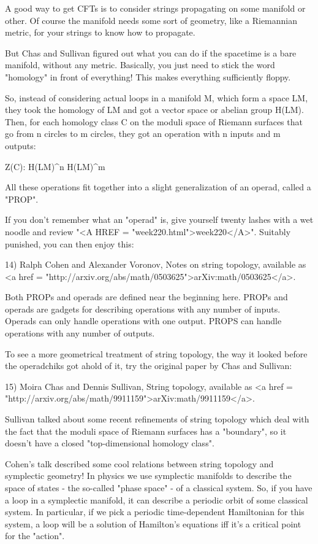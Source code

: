 A good way to get CFTs is to consider strings propagating on some
manifold or other.  Of course the manifold needs some sort of 
geometry, like a Riemannian metric, for your strings to know how 
to propagate.

But Chas and Sullivan figured out what you can do if the spacetime 
is a bare manifold, without any metric.  Basically, you just 
need to stick the word "homology" in front of everything!  This
makes everything sufficiently floppy.

So, instead of considering actual loops in a manifold M, 
which form a space LM, they took the homology of LM and got
a vector space or abelian group H(LM).  Then, for each homology 
class C on the moduli space of Riemann surfaces that go from n 
circles to m circles, they got an operation with n inputs and m
outputs:

Z(C): H(LM)^{\otimes n} \to  H(LM)^{\otimes m}

All these operations fit together into a slight generalization of 
an operad, called a "PROP".

If you don't remember what an "operad" is, give yourself
twenty lashes with a wet noodle and review "<A HREF =
"week220.html">week220</A>".  Suitably punished, you can then
enjoy this:

14) Ralph Cohen and Alexander Voronov, Notes on string topology,
available as <a href =
"http://arxiv.org/abs/math/0503625">arXiv:math/0503625</a>.

Both PROPs and operads are defined near the beginning here.
PROPs and operads are gadgets for describing operations with 
any number of inputs.  Operads can only handle operations with 
one output.  PROPS can handle operations with any number of outputs.

To see a more geometrical treatment of string topology, the way
it looked before the operadchiks got ahold of it, try the original 
paper by Chas and Sullivan:

15) Moira Chas and Dennis Sullivan, String topology, available as <a
href = "http://arxiv.org/abs/math/9911159">arXiv:math/9911159</a>.

Sullivan talked about some recent refinements of string topology
which deal with the fact that the moduli space of Riemann surfaces 
has a "boundary", so it doesn't have a closed "top-dimensional
homology class".  

Cohen's talk described some cool relations between string topology and
symplectic geometry!  In physics we use symplectic manifolds to
describe the space of states - the so-called "phase space" -
of a classical system.  So, if you have a loop in a symplectic
manifold, it can describe a periodic orbit of some classical system.
In particular, if we pick a periodic time-dependent Hamiltonian for
this system, a loop will be a solution of Hamilton's equations iff
it's a critical point for the "action".

